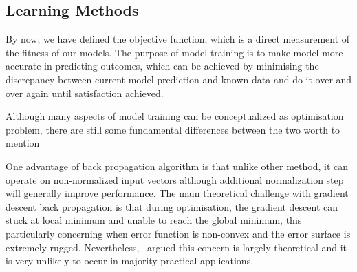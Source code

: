 \subsection {Learning Methods}
By now, we have defined the objective function, which is a direct measurement of the fitness of our models. The purpose of model training is to make model more accurate in predicting outcomes, which can be achieved by minimising the discrepancy between current model prediction and known data and do it over and over again until satisfaction achieved. 
\par 
Although many aspects of model training can be conceptualized as optimisation problem, there are still some fundamental differences between the two worth to mention

One advantage of back propagation algorithm is that unlike other method, it can operate on non-normalized input vectors although additional normalization step will generally improve performance. \cite{Buckland:2002} The main theoretical challenge with gradient descent back propagation is that during optimisation, the gradient descent can stuck at local minimum and unable to reach the global minimum, this particularly concerning when error function is non-convex and the error surface is extremely rugged. Nevertheless,~\citet{LeCun_2015} argued this concern is largely theoretical and it is very unlikely to occur in majority practical applications. 